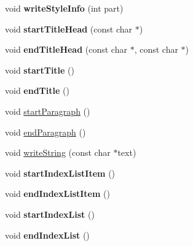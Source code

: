 \begin{DoxyCompactItemize}
\item 
\hypertarget{class_html_generator_ad3736313034c23173b4eac01d95b43d3}{void {\bfseries write\-Style\-Info} (int part)}\label{class_html_generator_ad3736313034c23173b4eac01d95b43d3}

\item 
\hypertarget{class_html_generator_a3f80d51c2cd9ad266f0dc628d4c349da}{void {\bfseries start\-Title\-Head} (const char $\ast$)}\label{class_html_generator_a3f80d51c2cd9ad266f0dc628d4c349da}

\item 
\hypertarget{class_html_generator_a9a24c735543f9033745a0179c5633d4c}{void {\bfseries end\-Title\-Head} (const char $\ast$, const char $\ast$)}\label{class_html_generator_a9a24c735543f9033745a0179c5633d4c}

\item 
\hypertarget{class_html_generator_a1259e131d6695a4bb53ec5e36692840a}{void {\bfseries start\-Title} ()}\label{class_html_generator_a1259e131d6695a4bb53ec5e36692840a}

\item 
\hypertarget{class_html_generator_a7b02cc485cad21197a018533aa05fe79}{void {\bfseries end\-Title} ()}\label{class_html_generator_a7b02cc485cad21197a018533aa05fe79}

\item 
void \hyperlink{class_html_generator_af7f590b00ecbe6117ddc09f0016df0ec}{start\-Paragraph} ()
\item 
void \hyperlink{class_html_generator_a3076b52ebe72e4b56c232817cf2a16f0}{end\-Paragraph} ()
\item 
void \hyperlink{class_html_generator_a02588a2412fdda1d3d31066be2802913}{write\-String} (const char $\ast$text)
\item 
\hypertarget{class_html_generator_a54bfbe844dbbb52acf519e07a207c2e0}{void {\bfseries start\-Index\-List\-Item} ()}\label{class_html_generator_a54bfbe844dbbb52acf519e07a207c2e0}

\item 
\hypertarget{class_html_generator_aec53f232bba59300d9a4fd4b1cf0f753}{void {\bfseries end\-Index\-List\-Item} ()}\label{class_html_generator_aec53f232bba59300d9a4fd4b1cf0f753}

\item 
\hypertarget{class_html_generator_a9b31ceb5ba1248cb820bad23a8c6624a}{void {\bfseries start\-Index\-List} ()}\label{class_html_generator_a9b31ceb5ba1248cb820bad23a8c6624a}

\item 
\hypertarget{class_html_generator_a38fc8c258fcd3d6196e12c1a51018c9a}{void {\bfseries end\-Index\-List} ()}\label{class_html_generator_a38fc8c258fcd3d6196e12c1a51018c9a}


\end{DoxyCompactItemize}
